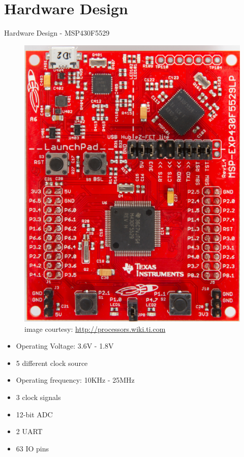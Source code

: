 \documentclass[t]{beamer} %
\begin{document}
\section{Hardware Design}
\begin{frame}{Hardware Design - MSP430F5529}
\fboxsep=0pt
\noindent
\begin{minipage}[t]{0.48\linewidth}
\vspace{1cm}
\begin{figure}[!ht]
	\centering
\includegraphics[scale=0.2]{MSP430_launchpad}
\caption{\tiny image courtesy: \url{http://processors.wiki.ti.com}}
\label{fig:msp430_launchpad}
\end{figure}
\end{minipage}
\hfill
\begin{minipage}[t]{0.48\linewidth}
\begin{itemize}
\item Operating Voltage: 3.6V - 1.8V
\item 5 different clock source
\item Operating frequency: 10KHz - 25MHz
\item 3 clock signals
\item 12-bit ADC
\item 2 UART 
\item 63 IO pins
\end{itemize}
\end{minipage}

\end{frame}
\end{document}
